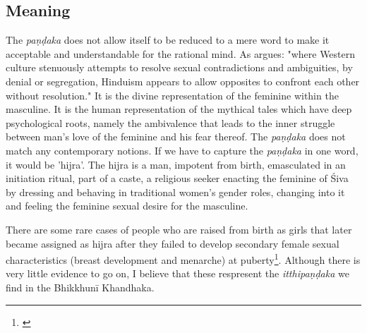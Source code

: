 \subsection{Meaning}
The {\em paṇḍaka} does not allow itself to be reduced to a mere word to make it acceptable and understandable for the rational mind. As \cite{nanda} argues: "where Western culture stenuously attempts to resolve sexual contradictions and ambiguities, by denial or segregation, Hinduism appears to allow opposites to confront each other without resolution." It is the divine representation of the feminine within the masculine. It is the human representation of the mythical tales which have deep psychological roots, namely the ambivalence that leads to the inner struggle between man's love of the feminine and his fear thereof. The {\em paṇḍaka} does not match any contemporary notions. If we have to capture the {\em paṇḍaka} in one word, it would be 'hijra'. The hijra is a man, impotent from birth, emasculated in an initiation ritual, part of a caste, a religious seeker enacting the feminine of Śiva by dressing and behaving in traditional women's gender roles, changing into it and feeling the feminine sexual desire for the masculine.

There are some rare cases of people who are raised from birth as girls that later became assigned as hijra after they failed to develop secondary female sexual characteristics (breast development and menarche) at puberty\footnote{\cite{nanda}}. Although there is very little evidence to go on, I believe that these respresent the {\em itthipaṇḍaka} we find in the Bhikkhunī Khandhaka.
